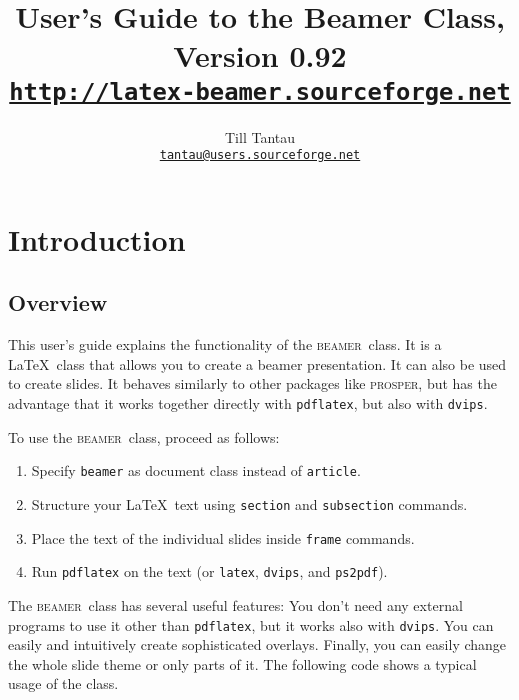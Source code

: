 \documentclass{article}
\def\beamer{\textsc{beamer}}
\begin{document}
\title{User's Guide to the Beamer Class, Version 0.92\\
\Large\href{http://latex-beamer.sourceforge.net}{\texttt{http://latex-beamer.sourceforge.net}}}
\author{Till Tantau\\
  \href{mailto:tantau@users.sourceforge.net}{\texttt{tantau@users.sourceforge.net}}}

\maketitle

\tableofcontents



\section{Introduction}


\subsection{Overview}

This user's guide explains the functionality of the \beamer\ class.
It is a \LaTeX\ class that allows you to create a beamer
presentation. It can also be used to create slides. It behaves
similarly to other packages like \textsc{prosper}, but has the
advantage that it works together directly with \texttt{pdflatex}, but
also with \texttt{dvips}.

To use the \beamer\ class, proceed as follows:
\begin{enumerate}
\item
  Specify \texttt{beamer} as document class instead of
  \texttt{article}.
\item
  Structure your \LaTeX\ text using \texttt{section} and
  \texttt{subsection} commands.
\item
  Place the text of the individual slides inside \texttt{frame}
  commands.
\item
  Run \texttt{pdflatex} on the text (or \texttt{latex},
  \texttt{dvips}, and \texttt{ps2pdf}).
\end{enumerate}

The \beamer\ class has several useful features: You don't need any
external programs to use it other than \texttt{pdflatex}, but it works
also with \texttt{dvips}. You can easily and intuitively create
sophisticated overlays. Finally, you can easily change the whole slide
theme or only parts of it. The following code shows a typical usage of
the class.
\end{document}
